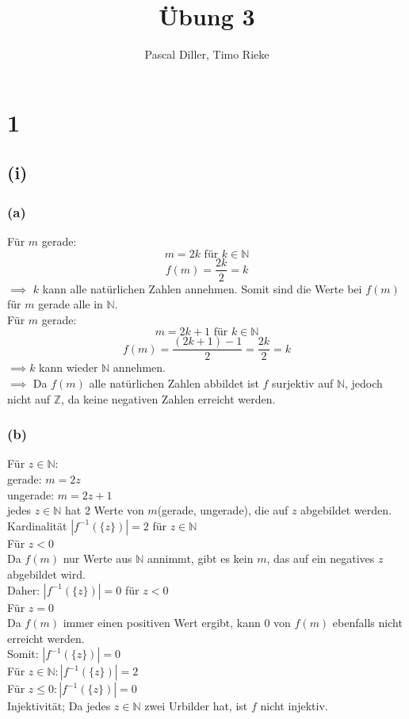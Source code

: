 \documentclass{article}
\title{Übung 3}
\author{Pascal Diller, Timo Rieke}
\begin{document}
\maketitle

\section{1}
\subsection{(i)}
\subsubsection{(a)}
Für $m$ gerade: \\
\[m = 2k \text{ für } k \in \mathbb{N}\]
\[f(m) = \frac{2k}{2} = k\]
$\implies$ $k$ kann alle natürlichen Zahlen annehmen. Somit sind die Werte bei $f(m)$ für $m$ gerade alle in $\mathbb{N}$. \\
\newline
Für $m$ gerade: \\
\[m = 2k + 1 \text{ für } k \in \mathbb{N}\]
\[f(m) = \frac{(2k + 1) - 1}{2} = \frac{2k}{2} = k\]
$\implies k$ kann wieder $\mathbb{N}$ annehmen. \\
\newline
$\implies$ Da $f(m)$ alle natürlichen Zahlen abbildet ist $f$ surjektiv auf $\mathbb{N}$, jedoch nicht auf $\mathbb{Z}$, da keine negativen Zahlen erreicht werden.
\subsubsection{(b)}
Für $z \in \mathbb{N}$: \\
gerade: $m = 2z$ \\
ungerade: $m = 2z+1$ \\
jedes $z \in \mathbb{N}$ hat 2 Werte von $m$(gerade, ungerade), die auf $z$ abgebildet werden. \\
Kardinalität $|f^{-1}(\{z\})| = 2$ für $z \in \mathbb{N}$ \\
\newline
Für $z < 0$ \\
Da $f(m)$ nur Werte aus $\mathbb{N}$ annimmt, gibt es kein $m$, das auf ein negatives $z$ abgebildet wird. \\
Daher: $|f^{-1}(\{z\})| = 0$ für $z < 0$ \\
\newline
Für $z=0$ \\
Da $f(m)$ immer einen positiven Wert ergibt, kann 0 von $f(m)$ ebenfalls nicht erreicht werden. \\
Somit: $|f^{-1}(\{z\})| = 0$\\
\newline
Für $z \in \mathbb{N}: |f^{-1}(\{z\})| = 2$ \\
Für $z \leq 0: |f^{-1}(\{z\})| = 0$ \\
\newline
Injektivität; Da jedes $z \in \mathbb{N}$ zwei Urbilder hat, ist $f$ nicht injektiv.
\end{document}

